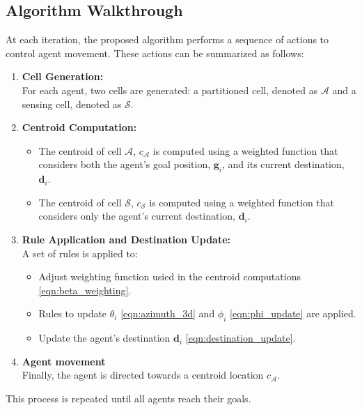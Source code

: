     \subsection{Algorithm Walkthrough}
        At each iteration, the proposed algorithm performs a sequence of actions to control agent movement. 
        These actions can be summarized as follows:
        \begin{enumerate}
            \item \textbf{Cell Generation:} \\
                For each agent, two cells are generated: a partitioned cell, denoted as $\mathcal{A}$ and a sensing cell, denoted as $\mathcal{S}$.
            \item \textbf{Centroid Computation:}
                \begin{itemize}
                    \item The centroid of cell $\mathcal{A}$, $c_{\mathcal{A}}$ is computed using a weighted function that considers both the agent's goal position, $\mathbf{g}_i$, and its current destination, $\mathbf{d}_i$.
                    \item The centroid of cell $\mathcal{S}$, $c_{\mathcal{S}}$ is computed using a weighted function that considers only the agent's current destination, $\mathbf{d}_i$.
                \end{itemize}
            \item \textbf{Rule Application and Destination Update:} \\
                A set of rules is applied to: 
                \begin{itemize}
                    \item Adjust weighting function usied in the centroid computations \eqref{eqn:beta_weighting}.
                    \item Rules to update $\theta_i$ \eqref{eqn:azimuth_3d} and $\phi_i$ \eqref{eqn:phi_update} are applied.
                    \item Update the agent's destination $\mathbf{d}_i$ \eqref{eqn:destination_update}.
                \end{itemize}
            \item \textbf{Agent movement} \\
                Finally, the agent is directed towards a centroid location $c_{\mathcal{A}}$.
        \end{enumerate}
        This process is repeated until all agents reach their goals.

